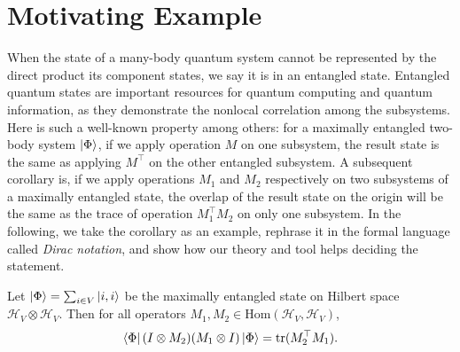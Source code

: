\documentclass[manuscript, review, timestamp]{acmart}
\begin{document}
\section{Motivating Example}

When the state of a many-body quantum system cannot be represented by the direct product its component states, we say it is in an entangled state. Entangled quantum states are important resources for quantum computing and quantum information, as they demonstrate the nonlocal correlation among the subsystems. 
Here is such a well-known property among others: for a maximally entangled two-body system $\ket{\Phi}$, if we apply operation $M$ on one subsystem, the result state is the same as applying $M^\top$ on the other entangled subsystem. 
A subsequent corollary is, if we apply operations $M_1$ and $M_2$ respectively on two subsystems of a maximally entangled state, the overlap of the result state on the origin will be the same as the trace of operation $M_1^\top M_2$ on only one subsystem. In the following, we take the corollary as an example, rephrase it in the formal language called \textit{Dirac notation},
and show how our theory and tool helps deciding the statement.

\begin{example}
  Let $\ket{\Phi} = \sum_{i \in V}\ket{i, i}$ be the maximally entangled state on Hilbert space $\mathcal{H}_V\otimes\mathcal{H}_V$. Then for all operators $M_1, M_2 \in \mathrm{Hom}(\mathcal{H}_V, \mathcal{H}_V)$,
  $$
  \bra{\Phi} (I \otimes M_2) (M_1 \otimes I) \ket{\Phi} = \mathrm{tr}(M_2^\top M_1).
  $$
\end{example}
\end{document}
